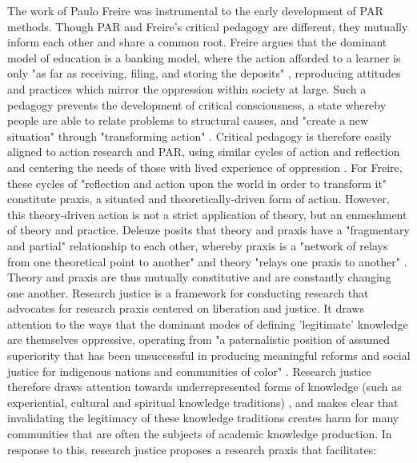 The work of Paulo Freire was instrumental to the early development of PAR methods. Though PAR and Freire's critical pedagogy are different, they mutually inform each other and share a common root. Freire argues that the dominant model of education is a banking model, where the action afforded to a learner is only "as far as receiving, filing, and storing the deposits" \citep[72]{freire_pedagogy_2000}, reproducing attitudes and practices which mirror the oppression within society at large. Such a pedagogy prevents the development of critical consciousness, a state whereby people are able to relate problems to structural causes, and "create a new situation" through "transforming action" \cite[47]{freire_pedagogy_2000}. Critical pedagogy is therefore easily aligned to action research and PAR, using similar cycles of action and reflection and centering the needs of those with lived experience of oppression \citep{serpa_political-pedagogical_2020}. For Freire, these cycles of "reflection and action upon the world in order to transform it" \cite[51]{freire_pedagogy_2000} constitute praxis, a situated and theoretically-driven form of action. However, this theory-driven action is not a strict application of theory, but an enmeshment of theory and practice. Deleuze posits that theory and praxis have a "fragmentary and partial" relationship to each other, whereby praxis is a "network of relays from one theoretical point to another" and theory "relays one praxis to another" \citep{deleuze_desert_2004, 206}. Theory and praxis are thus mutually constitutive and are constantly changing one another.
Research justice is a framework for conducting research that advocates for research praxis centered on liberation and justice. It draws attention to the ways that the dominant modes of defining 'legitimate' knowledge are themselves oppressive, operating from "a paternalistic position of assumed superiority that has been unsuccessful in producing meaningful reforms and social justice for indigenous nations and communities of color" \citep{jolivette_research_2015}. Research justice therefore draws attention towards underrepresented forms of knowledge (such as experiential, cultural and spiritual knowledge traditions) \cite[4]{asad_prefigurative_2019}, and makes clear that invalidating the legitimacy of these knowledge traditions creates harm for many communities that are often the subjects of academic knowledge production. In response to this, research justice proposes a research praxis that facilitates:

